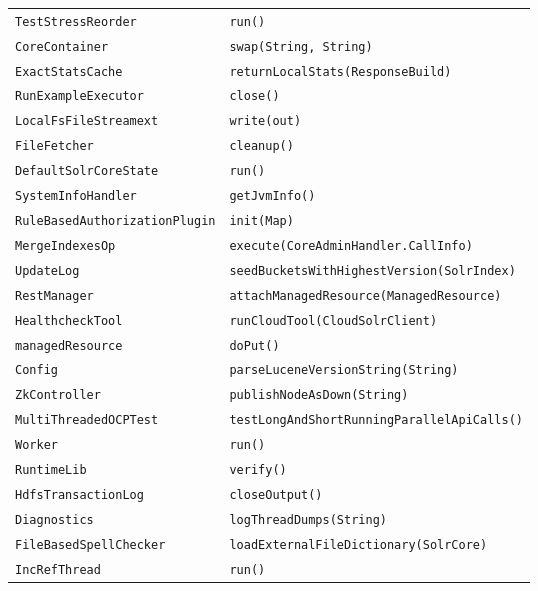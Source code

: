 \begin{center}
\begin{longtable}{ll}
\lstinline/TestStressReorder/&{\lstinline/run()/}\\
\lstinline/CoreContainer/&{\lstinline/swap(String, String)/}\\
\lstinline/ExactStatsCache/&{\lstinline/returnLocalStats(ResponseBuild)/}\\
\lstinline/RunExampleExecutor/&{\lstinline/close()/}\\
\lstinline/LocalFsFileStreamext/&{\lstinline/write(out)/}\\
\lstinline/FileFetcher/&{\lstinline/cleanup()/}\\
\lstinline/DefaultSolrCoreState/&{\lstinline/run()/}\\
\lstinline/SystemInfoHandler/&{\lstinline/getJvmInfo()/}\\
\lstinline/RuleBasedAuthorizationPlugin/&{\lstinline/init(Map)/}\\
\lstinline/MergeIndexesOp/&{\lstinline/execute(CoreAdminHandler.CallInfo)/}\\
\lstinline/UpdateLog/&{\lstinline/seedBucketsWithHighestVersion(SolrIndex)/}\\
\lstinline/RestManager/&{\lstinline/attachManagedResource(ManagedResource)/}\\
\lstinline/HealthcheckTool/&{\lstinline/runCloudTool(CloudSolrClient)/}\\
\lstinline/managedResource/&{\lstinline/doPut()/}\\
\lstinline/Config/&{\lstinline/parseLuceneVersionString(String)/}\\
\lstinline/ZkController/&{\lstinline/publishNodeAsDown(String)/}\\
\lstinline/MultiThreadedOCPTest/&{\lstinline/testLongAndShortRunningParallelApiCalls()/}\\
\lstinline/Worker/&{\lstinline/run()/}\\
\lstinline/RuntimeLib/&{\lstinline/verify()/}\\
\lstinline/HdfsTransactionLog/&{\lstinline/closeOutput()/}\\
\lstinline/Diagnostics/&{\lstinline/logThreadDumps(String)/}\\
\lstinline/FileBasedSpellChecker/&{\lstinline/loadExternalFileDictionary(SolrCore)/}\\
\lstinline/IncRefThread/&{\lstinline/run()/}\\
\end{longtable}
\end{center}


